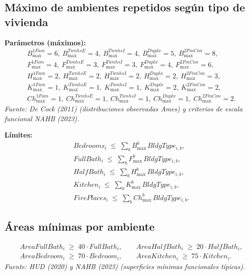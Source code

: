 \subsection{Máximo de ambientes repetidos según tipo de vivienda}
\textbf{Parámetros (máximos):}
\begin{align}
& B_{\max}^{1Fam}=6,\ B_{\max}^{TwnhsE}=4,\ B_{\max}^{TwnhsI}=4,\ B_{\max}^{Duplx}=5,\ B_{\max}^{2FmCon}=8,\\
& F_{\max}^{1Fam}=4,\ F_{\max}^{TwnhsE}=3,\ F_{\max}^{TwnhsI}=3,\ F_{\max}^{Duplx}=4,\ F_{\max}^{2FmCon}=6,\\
& H_{\max}^{1Fam}=2,\ H_{\max}^{TwnhsE}=2,\ H_{\max}^{TwnhsI}=2,\ H_{\max}^{Duplx}=2,\ H_{\max}^{2FmCon}=3,\\
& K_{\max}^{1Fam}=1,\ K_{\max}^{TwnhsE}=1,\ K_{\max}^{TwnhsI}=1,\ K_{\max}^{Duplx}=2,\ K_{\max}^{2FmCon}=2,\\
& Ch_{\max}^{1Fam}=1,\ Ch_{\max}^{TwnhsE}=1,\ Ch_{\max}^{TwnhsI}=1,\ Ch_{\max}^{Duplx}=1,\ Ch_{\max}^{2FmCon}=2.
\end{align}
\noindent\textit{\footnotesize Fuente: De Cock (2011) (distribuciones observadas Ames) y criterios de escala funcional NAHB (2023).}

\textbf{Límites:}
\begin{align}
& Bedrooms_i \;\le\; \sum_b B_{\max}^{b} \, BldgType_{i,b},\\
& FullBath_i \;\le\; \sum_b F_{\max}^{b} \, BldgType_{i,b},\\
& HalfBath_i \;\le\; \sum_b H_{\max}^{b} \, BldgType_{i,b},\\
& Kitchen_i \;\le\; \sum_b K_{\max}^{b} \, BldgType_{i,b},\\
& FirePlaces_i \;\le\; \sum_b Ch_{\max}^{b} \, BldgType_{i,b}.
\end{align}


\subsection{Áreas mínimas por ambiente}
\begin{align}
& AreaFullBath_i \;\ge\; 40\cdot FullBath_i, \qquad
  AreaHalfBath_i \;\ge\; 20\cdot HalfBath_i,\\
& AreaBedroom_i \;\ge\; 70\cdot Bedroom_i, \qquad
  AreaKitchen_i \;\ge\; 75\cdot Kitchen_i.
\end{align}
\noindent\textit{\footnotesize Fuente: HUD (2020) y NAHB (2023) (superficies mínimas funcionales típicas).}



